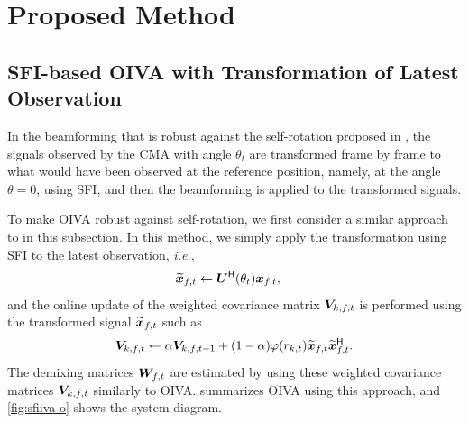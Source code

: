 \documentclass[sip,biber]{now-journal}
\begin{document}
\section{Proposed Method}\label{sec:proposed}


\subsection{SFI-based OIVA with Transformation of Latest Observation}

In the beamforming that is robust against the self-rotation proposed in \cite{Wakabayashi:2023:ASLP},
the signals observed by the CMA with angle $\theta_t$ are transformed frame by frame to what would have been observed at the reference position,
namely, at the angle $\theta=0$, using SFI, and then the beamforming is applied to the transformed signals.

To make OIVA robust against self-rotation, we first consider a similar approach to \cite{Wakabayashi:2023:ASLP} in this subsection.
In this method, we simply apply the transformation using SFI to the latest observation, \emph{i.e.},
\begin{align}
  \refpos{\Obs} _{\ft} &\gets \rotMat ^{\hermite} (\rotSpat _{\tframe}) \Obs _{\ft},
  \label{eq:sfi:obs}
\end{align}
and the online update of the weighted covariance matrix $\cov _{\src,\ft}$ is performed using the transformed signal $\refpos{\Obs} _{\ft}$ such as
\begin{align}
  \cov _{\src,\ft}\gets \forget \cov _{\src,\ft[-1]} + (1 - \forget) \weight(\var _{\src,\tframe}) \refpos{\Obs} _{\ft} \refpos{\Obs} _{\ft} ^{\hermite}.
  \label{eq:cov:rot}
\end{align}
The demixing matrices $\Demix _{\ft}$ are estimated by using these weighted covariance matrices $\cov _{\src,\ft}$ similarly to OIVA.
 summarizes OIVA using this approach, and \cref{fig:sfiiva-o} shows the system diagram.
\end{document}
